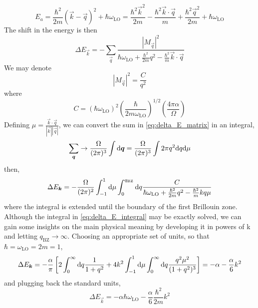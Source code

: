 \begin{equation}
    E_a = \frac{\hbar^2}{2m}(\vec{k}-\vec{q})^2 + \hbar\omega_\text{LO}
    = \frac{\hbar^2\vec{k}^2}{2m} - \frac{\hbar^2\vec{k}\cdot\vec{q}}{m} + \frac{\hbar^2\vec{q}^2}{2m} + \hbar\omega_\text{LO}
\end{equation}
The shift in the energy is then
\begin{equation} \label{eq:delta_E_matrix}
    \Delta E_\vec{k} = -\sum_\vec{q} \frac{|M_\vec{q}|^2}{\hbar\omega_\text{LO} + \frac{\hbar^2}{2m}q^2 - \frac{\hbar^2}{m}\vec{k}\cdot\vec{q}}
\end{equation}
We may denote
\begin{equation}
    |M_\vec{q}|^2 = \frac{C}{q^2}
\end{equation}
where
\begin{equation}
    C = (\hbar \omega_\text{LO})^2 \left(\frac{\hbar}{2m\omega_\text{LO}}\right)^{1/2} \left(\frac{4\pi\alpha}{\Omega}\right)
\end{equation}
Defining $\mu = \frac{\vec{k}\cdot\vec{q}}{|\vec{k}||\vec{q}|}$, we can convert the sum in \cref{eq:delta_E_matrix} in an integral,
\begin{equation}
    \sum_\vec{q} \rightarrow \frac{\Omega}{(2\pi)^3} \int \differential\vec{q} = \frac{\Omega}{(2\pi)^3} \int 2\pi q^2 \differential q \differential \mu
\end{equation}
then,
\begin{equation}\label{eq:delta_E_integral}
    \Delta E_\vec{k} = - \frac{\Omega}{(2\pi)^2} \int_{-1}^1 \differential \mu \int_0^{q_\text{BZ}} \differential q \frac{C}{\hbar\omega_\text{LO} + \frac{\hbar^2}{2m}q^2 - \frac{\hbar^2}{m} kq\mu}
\end{equation}
where the integral is extended until the boundary of the first Brillouin zone. Although the integral in \cref{eq:delta_E_integral} may be exactly solved, we can gain some insights on the main physical meaning by developing it in powers of k and letting $q_\text{BZ} \rightarrow \infty$. Choosing an appropriate set of units, so that $\hbar  = \omega_\text{LO} = 2m = 1$,
\begin{equation}
    \Delta E_\vec{k} = - \frac{\alpha}{\pi} \left[
        2\int_0^\infty \differential q \frac{1}{1+q^2}
        + 4k^2 \int_{-1}^1 \differential \mu \int_0^\infty \differential q \frac{q^2\mu^2}{(1+q^2)^3} \right]
    = - \alpha - \frac{\alpha}{6}k^2
\end{equation}
and plugging back the standard units,
\begin{equation}
    \Delta E_\vec{k} = -\alpha \hbar \omega_\text{LO} - \frac{\alpha}{6}\frac{\hbar^2}{2m}k^2
\end{equation}
